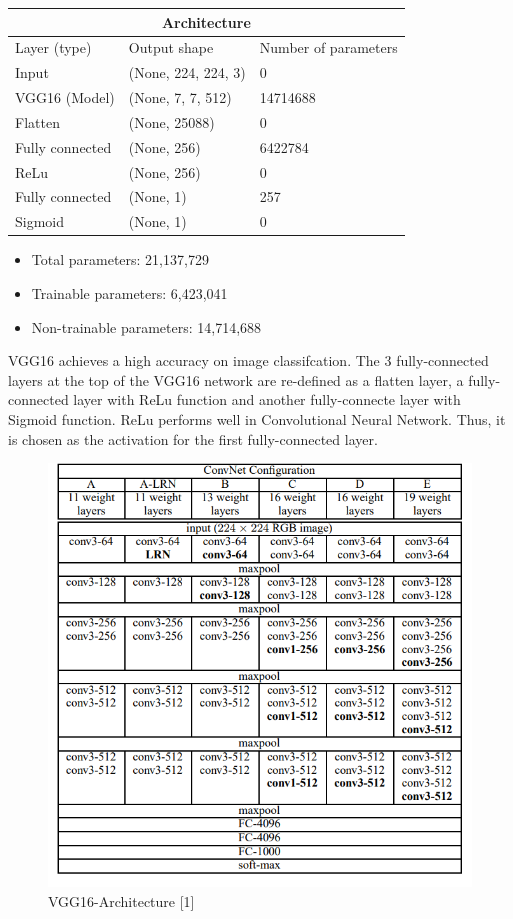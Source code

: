 \documentclass[a4paper,10pt]{article}
\begin{document}
\begin{tabular}{ |p{4cm}|p{4cm}|p{4cm}|}
  \hline
  \multicolumn{3}{|c|}{Architecture} \\
  \hline
  Layer (type) & Output shape & Number of parameters \\
  \hline
  Input              & (None, 224, 224, 3)& 0 \\
  VGG16 (Model)      & (None, 7, 7, 512)  & 14714688 \\
  Flatten            & (None, 25088)      & 0   \\
  Fully connected    & (None, 256)        & 6422784 \\
  ReLu               & (None, 256)        & 0 \\
  Fully connected    & (None, 1)          & 257\\
  Sigmoid            & (None, 1)          & 0 \\
  \hline
\end{tabular}

\begin{itemize}
  \item Total parameters: 21,137,729
  \item Trainable parameters: 6,423,041
  \item Non-trainable parameters: 14,714,688
\end{itemize}


VGG16 achieves a high accuracy on image classifcation. 
The 3 fully-connected layers at the top of the VGG16 network are re-defined 
as a flatten layer, a fully-connected layer with ReLu function 
and another fully-connecte layer with Sigmoid function.
ReLu performs well in Convolutional Neural Network. 
Thus, it is chosen as the activation for the first fully-connected layer.

\begin{figure}[H]
  \centering
  \includegraphics[width=12cm]{./images/vgg16-architecture.png}
     \caption{VGG16-Architecture [1]
             }
        \label{vgg16-architecture}
\end{figure}
\end{document}

